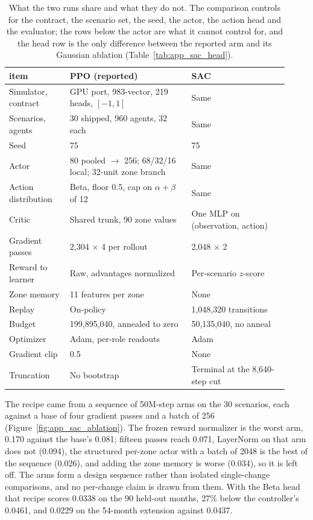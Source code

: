 \documentclass{article}
\begin{document}
\begin{table}[h!]
\centering
\small
\begin{tabular}{@{}p{0.20\linewidth}p{0.40\linewidth}p{0.32\linewidth}@{}}
\toprule
item & PPO (reported) & SAC \\
\midrule
Simulator, contract & GPU port, 983-vector, 219 heads, $[-1,1]$ & Same \\
Scenarios, agents & 30 shipped, 960 agents, 32 each & Same \\
Seed & 75 & 75 \\
Actor & 80 pooled $\to$ 256; 68/32/16 local; 32-unit zone branch & Same \\
Action distribution & Beta, floor 0.5, cap on $\alpha+\beta$ of 12 & Same \\
Critic & Shared trunk, 90 zone values & One MLP on (observation, action) \\
Gradient passes & 2{,}304 $\times$ 4 per rollout & 2{,}048 $\times$ 2 \\
Reward to learner & Raw, advantages normalized & Per-scenario $z$-score \\
Zone memory & 11 features per zone & None \\
Replay & On-policy & 1{,}048{,}320 transitions \\
Budget & 199{,}895{,}040, annealed to zero & 50{,}135{,}040, no anneal \\
Optimizer & Adam, per-role readouts & Adam \\
Gradient clip & 0.5 & None \\
Truncation & No bootstrap & Terminal at the 8{,}640-step cut \\
\bottomrule
\end{tabular}
\vspace{4pt}
\caption{What the two runs share and what they do not. The comparison controls for the contract, the scenario set, the seed, the actor, the action head and the evaluator; the rows below the actor are what it cannot control for, and the head row is the only difference between the reported arm and its Gaussian ablation (Table~\ref{tab:app_sac_head}).}
\label{tab:app_shared}
\end{table}

The recipe came from a sequence of 50M-step arms on the 30 scenarios, each against a base of four gradient passes and a batch of 256 (Figure~\ref{fig:app_sac_ablation}). The frozen reward normalizer is the worst arm, 0.170 against the base's 0.081; fifteen passes reach 0.071, LayerNorm on that arm does not (0.094), the structured per-zone actor with a batch of 2048 is the best of the sequence (0.026), and adding the zone memory is worse (0.034), so it is left off. The arms form a design sequence rather than isolated single-change comparisons, and no per-change claim is drawn from them. With the Beta head that recipe scores 0.0338 on the 90 held-out months, 27\% below the controller's 0.0461, and 0.0229 on the 54-month extension against 0.0437.
\end{document}
